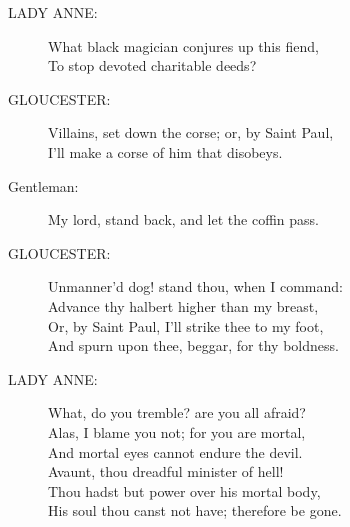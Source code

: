 \documentclass{article}
\begin{document}
\begin{description}
\item[LADY ANNE:] 
\hspace{1pt}What black magician conjures up this fiend,\\
\hspace{1pt}To stop devoted charitable deeds?\\
\end{description}
\begin{description}
\item[GLOUCESTER:] 
\hspace{1pt}Villains, set down the corse; or, by Saint Paul,\\
\hspace{1pt}I'll make a corse of him that disobeys.\\
\end{description}
\begin{description}
\item[Gentleman:] 
\hspace{1pt}My lord, stand back, and let the coffin pass.\\
\end{description}
\begin{description}
\item[GLOUCESTER:] 
\hspace{1pt}Unmanner'd dog! stand thou, when I command:\\
\hspace{1pt}Advance thy halbert higher than my breast,\\
\hspace{1pt}Or, by Saint Paul, I'll strike thee to my foot,\\
\hspace{1pt}And spurn upon thee, beggar, for thy boldness.\\
\end{description}
\begin{description}
\item[LADY ANNE:] 
\hspace{1pt}What, do you tremble? are you all afraid?\\
\hspace{1pt}Alas, I blame you not; for you are mortal,\\
\hspace{1pt}And mortal eyes cannot endure the devil.\\
\hspace{1pt}Avaunt, thou dreadful minister of hell!\\
\hspace{1pt}Thou hadst but power over his mortal body,\\
\hspace{1pt}His soul thou canst not have; therefore be gone.\\
\end{description}
\end{document}
